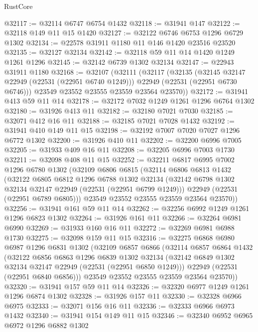 \begin{lexlean}{RustCore}
\begin{coremodule}
@32117 := @32114 @6747 @6754 @1432
@32118 := @31941 @147
@32122 := @32118 @149 @11 @15 @1420
@32127 := @32122 @6746 @6753 @1296 @6729 @1302
@32134 := @22578 @31911 @1180 @11 @146 @1420 @23516 @23520
@32135 := @32127 @32134
@32142 := @32118 @59 @11 @14 @1420 @1249 @1261 @1296
@32145 := @32142 @6739 @1302 @32134
@32147 := @22943 @31911 @1180
@32168 := @32107
    (@32111
      (@32117
        (@32135
          (@32145 @32147 @22949 (@22531 (@22951 @6740 @1249)))
          @22949
          (@22531 (@22951 @6730 @6746)))
        @23549
        @23552
        @23555
        @23559
        @23564
        @23570))
@32172 := @31941 @413 @59 @11 @14
@32178 := @32172 @7032 @1249 @1261 @1296 @6764 @1302
@32180 := @31926 @413 @11
@32182 := @32180 @7021 @7030
@32185 := @32071 @412 @16 @11
@32188 := @32185 @7021 @7028 @1432
@32192 := @31941 @410 @149 @11 @15
@32198 := @32192 @7007 @7020 @7027 @1296 @6772 @1302
@32200 := @31926 @410 @11
@32202 := @32200 @6996 @7005
@32205 := @31933 @409 @16 @11
@32208 := @32205 @6996 @7003 @1730
@32211 := @32098 @408 @11 @15
@32252 := @32211
    @6817
    @6995
    @7002
    @1296
    @6780
    @1302
    (@32109
      @6806
      @6815
      (@32114
        @6806
        @6813
        @1432
        (@32122
          @6805
          @6812
          @1296
          @6788
          @1302
          @32134
          (@32142 @6798 @1302 @32134 @32147 @22949 (@22531 (@22951 @6799 @1249)))
          @22949
          (@22531 (@22951 @6789 @6805)))
        @23549
        @23552
        @23555
        @23559
        @23564
        @23570))
@32256 := @31941 @161 @59 @11 @14
@32262 := @32256 @6992 @1249 @1261 @1296 @6823 @1302
@32264 := @31926 @161 @11
@32266 := @32264 @6981 @6990
@32269 := @31933 @160 @16 @11
@32272 := @32269 @6981 @6988 @1730
@32275 := @32098 @159 @11 @15
@32316 := @32275
    @6868
    @6980
    @6987
    @1296
    @6831
    @1302
    (@32109
      @6857
      @6866
      (@32114
        @6857
        @6864
        @1432
        (@32122
          @6856
          @6863
          @1296
          @6839
          @1302
          @32134
          (@32142 @6849 @1302 @32134 @32147 @22949 (@22531 (@22951 @6850 @1249)))
          @22949
          (@22531 (@22951 @6840 @6856)))
        @23549
        @23552
        @23555
        @23559
        @23564
        @23570))
@32320 := @31941 @157 @59 @11 @14
@32326 := @32320 @6977 @1249 @1261 @1296 @6874 @1302
@32328 := @31926 @157 @11
@32330 := @32328 @6966 @6975
@32333 := @32071 @156 @16 @11
@32336 := @32333 @6966 @6973 @1432
@32340 := @31941 @154 @149 @11 @15
@32346 := @32340 @6952 @6965 @6972 @1296 @6882 @1302

\end{coremodule}
\end{lexlean}
